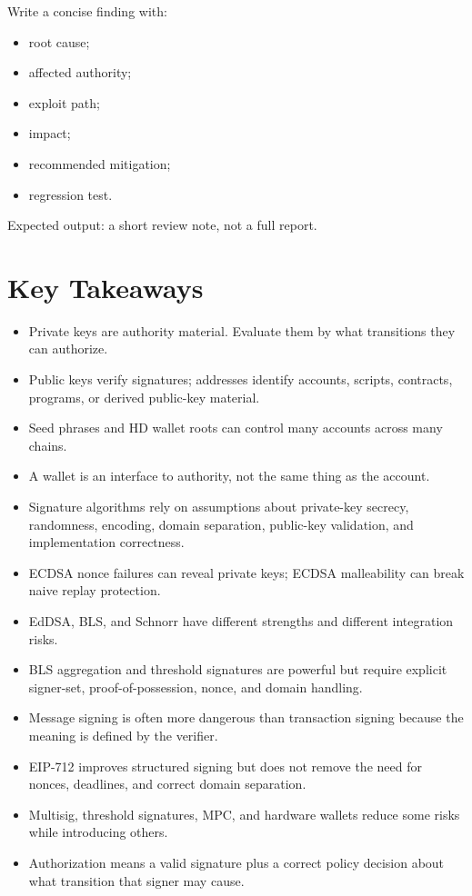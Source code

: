 Write a concise finding with:

\begin{itemize}
\tightlist
\item
  root cause;
\item
  affected authority;
\item
  exploit path;
\item
  impact;
\item
  recommended mitigation;
\item
  regression test.
\end{itemize}

Expected output: a short review note, not a full report.

\section{Key Takeaways}

\begin{itemize}
\tightlist
\item
  Private keys are authority material. Evaluate them by what transitions
  they can authorize.
\item
  Public keys verify signatures; addresses identify accounts, scripts,
  contracts, programs, or derived public-key material.
\item
  Seed phrases and HD wallet roots can control many accounts across many
  chains.
\item
  A wallet is an interface to authority, not the same thing as the
  account.
\item
  Signature algorithms rely on assumptions about private-key secrecy,
  randomness, encoding, domain separation, public-key validation, and
  implementation correctness.
\item
  ECDSA nonce failures can reveal private keys; ECDSA malleability can
  break naive replay protection.
\item
  EdDSA, BLS, and Schnorr have different strengths and different
  integration risks.
\item
  BLS aggregation and threshold signatures are powerful but require
  explicit signer-set, proof-of-possession, nonce, and domain handling.
\item
  Message signing is often more dangerous than transaction signing
  because the meaning is defined by the verifier.
\item
  EIP-712 improves structured signing but does not remove the need for
  nonces, deadlines, and correct domain separation.
\item
  Multisig, threshold signatures, MPC, and hardware wallets reduce some
  risks while introducing others.
\item
  Authorization means a valid signature plus a correct policy decision
  about what transition that signer may cause.
\end{itemize}

